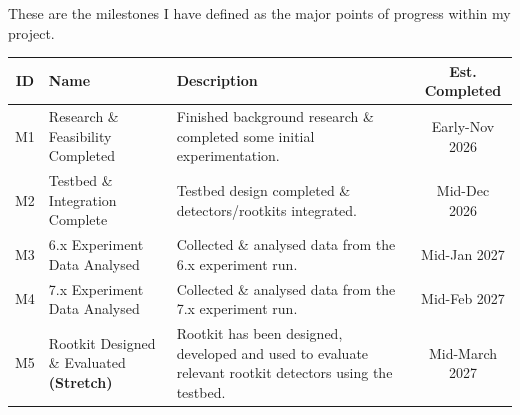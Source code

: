 \documentclass[10pt, a4paper]{article} %
\begin{document}
These are the milestones I have defined as the major points of progress within my project.
\begin{table}[h]
  \centering
  \begin{tabular}{|c|p{6cm}|p{6cm}|c|}
    \hline
    \textbf{ID} & \textbf{Name} & \textbf{Description} & \textbf{Est. Completed} \\
    \hline
    M1 & Research \& Feasibility Completed  & Finished background research \& completed some initial experimentation. & Early-Nov 2026 \\
    \hline
    M2 & Testbed \& Integration Complete & Testbed design completed \& detectors/rootkits integrated. & Mid-Dec 2026 \\
    \hline
    M3 & 6.x Experiment Data Analysed & Collected \& analysed data from the 6.x experiment run. & Mid-Jan 2027 \\
    \hline
    M4 & 7.x Experiment Data Analysed & Collected \& analysed data from the 7.x experiment run. & Mid-Feb 2027 \\
    \hline
    M5 & Rootkit Designed \& Evaluated \textbf{(Stretch)} & Rootkit has been designed, developed and used to evaluate relevant rootkit detectors using the testbed. & Mid-March 2027 \\
    \hline
  \end{tabular}
\end{table}
\end{document}
